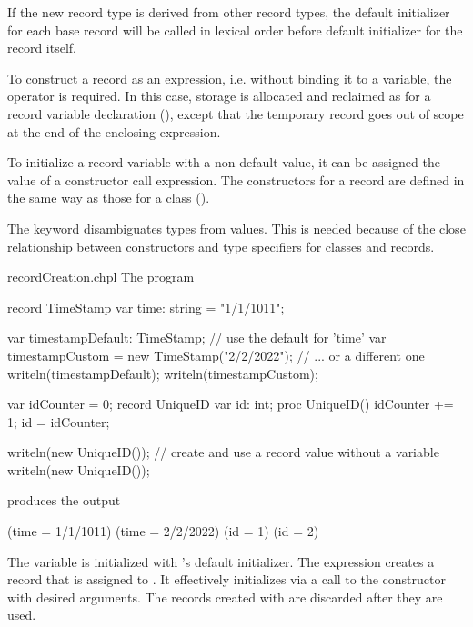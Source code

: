 If the new record type is derived from other record types, the
default initializer for each base record will be called in lexical order before default
initializer for the record itself.

To construct a record as an expression,
i.e. without binding it to a variable, the  operator is
required.  In this case, storage is allocated and reclaimed as for a record
variable declaration (), except that the temporary record
goes out of scope at the end of the enclosing expression.

To initialize a record variable with a non-default value, it can be assigned
the value of a constructor call expression.  The constructors for a record are
defined in the same way as those for a class ().

\begin{rationale}
The  keyword disambiguates types from values. This is needed because of the close
relationship between constructors and type specifiers for classes and
records.
\end{rationale}

\begin{chapelexample}{recordCreation.chpl}
The program
\begin{chapel}
record TimeStamp {
  var time: string = "1/1/1011";
}

var timestampDefault: TimeStamp;                  // use the default for 'time'
var timestampCustom = new TimeStamp("2/2/2022");  // ... or a different one
writeln(timestampDefault);
writeln(timestampCustom);

var idCounter = 0;
record UniqueID {
  var id: int;
  proc UniqueID() { idCounter += 1; id = idCounter; }
}

writeln(new UniqueID());  // create and use a record value without a variable
writeln(new UniqueID());
\end{chapel}
produces the output
\begin{chapelprintoutput}{}
(time = 1/1/1011)
(time = 2/2/2022)
(id = 1)
(id = 2)
\end{chapelprintoutput}
The variable  is initialized with 's
default initializer. The expression  creates a record that
is assigned to .  It effectively
initializes  via a call to the constructor with desired
arguments. The records created with  are discarded after
they are used.
\end{chapelexample}

